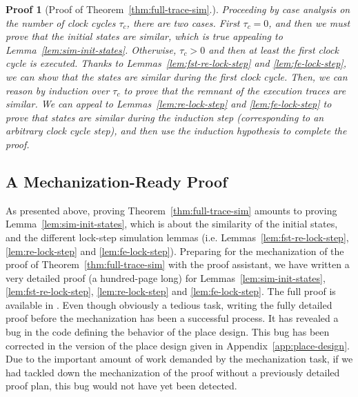 \documentclass[pdflatex,sn-mathphys]{sn-jnl}%
\theoremstyle{thmstyleone}%
\theoremstyle{thmstyletwo}%
\newtheorem*{pf}{Proof}%
\theoremstyle{thmstylethree}%
\begin{document}
\begin{pf}[Proof of Theorem~\ref{thm:full-trace-sim}.]
  
  Proceeding by case analysis on the number of clock cycles $\tau_c$,
  there are two cases. First $\tau_c=0$, and then we must prove that the
  initial states are similar, which is true appealing to
  Lemma~\ref{lem:sim-init-states}. Otherwise, $\tau_c>0$ and then at
  least the first clock cycle is executed. Thanks to
  Lemmas~\ref{lem:fst-re-lock-step} and \ref{lem:fe-lock-step}, we can
  show that the states are similar during the first clock cycle. Then,
  we can reason by induction over $\tau_c$ to prove that the remnant of
  the execution traces are similar. We can appeal to
  Lemmas~\ref{lem:re-lock-step} and \ref{lem:fe-lock-step} to prove
  that states are similar during the induction step (corresponding to
  an arbitrary clock cycle step), and then use the induction
  hypothesis to complete the proof.

\end{pf}

\subsection{A Mechanization-Ready Proof}
\label{sec:mecha-ready-pf}

As presented above, proving Theorem~\ref{thm:full-trace-sim} amounts
to proving Lemma~\ref{lem:sim-init-states}, which is about the
similarity of the initial states, and the different lock-step
simulation lemmas (i.e. Lemmas~\ref{lem:fst-re-lock-step},
\ref{lem:re-lock-step} and \ref{lem:fe-lock-step}). Preparing for the
mechanization of the proof of Theorem~\ref{thm:full-trace-sim} with
the \coq{} proof assistant, we have written a very detailed proof (a
hundred-page long) for Lemmas~\ref{lem:sim-init-states},
\ref{lem:fst-re-lock-step}, \ref{lem:re-lock-step} and
\ref{lem:fe-lock-step}. The full proof is available in
\cite{Iampietro2021}. Even though obviously a tedious task, writing
the fully detailed proof before the mechanization has been a
successful process. It has revealed a bug in the \vhdl{} code defining
the behavior of the place design. This bug has been corrected in the
version of the place design given in Appendix~\ref{app:place-design}.
Due to the important amount of work demanded by the mechanization
task, if we had tackled down the mechanization of the proof without a
previously
detailed proof plan, this bug would not have yet been detected. \\
\end{document}
